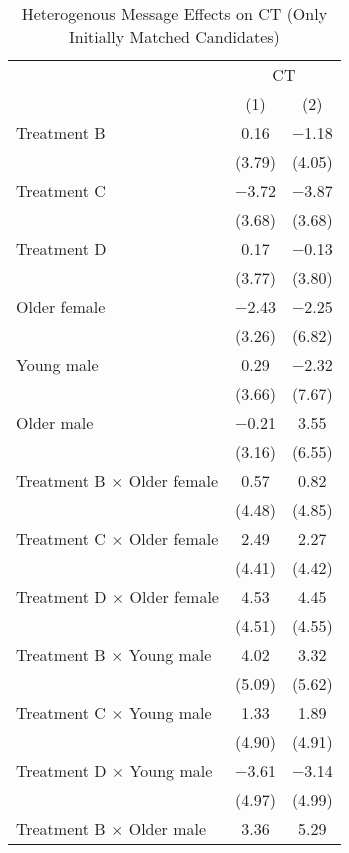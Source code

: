 \documentclass[12pt, a4paper]{article}
\begin{document}
\begin{table}[H]

\caption{\label{tab:lm-test-interaction-init-reg}Heterogenous Message Effects on CT (Only Initially Matched Candidates)}
\centering
\fontsize{8}{10}\selectfont
\begin{threeparttable}
\begin{tabular}[t]{lcc}
\toprule
\multicolumn{1}{c}{ } & \multicolumn{2}{c}{CT} \\
\cmidrule(l{3pt}r{3pt}){2-3}
  & (1) & (2)\\
\midrule
Treatment B & \num{0.16} & \num{-1.18}\\
 & (\num{3.79}) & (\num{4.05})\\
Treatment C & \num{-3.72} & \num{-3.87}\\
 & (\num{3.68}) & (\num{3.68})\\
Treatment D & \num{0.17} & \num{-0.13}\\
 & (\num{3.77}) & (\num{3.80})\\
Older female & \num{-2.43} & \num{-2.25}\\
 & (\num{3.26}) & (\num{6.82})\\
Young male & \num{0.29} & \num{-2.32}\\
 & (\num{3.66}) & (\num{7.67})\\
Older male & \num{-0.21} & \num{3.55}\\
 & (\num{3.16}) & (\num{6.55})\\
Treatment B $\times$ Older female & \num{0.57} & \num{0.82}\\
 & (\num{4.48}) & (\num{4.85})\\
Treatment C $\times$ Older female & \num{2.49} & \num{2.27}\\
 & (\num{4.41}) & (\num{4.42})\\
Treatment D $\times$ Older female & \num{4.53} & \num{4.45}\\
 & (\num{4.51}) & (\num{4.55})\\
Treatment B $\times$ Young male & \num{4.02} & \num{3.32}\\
 & (\num{5.09}) & (\num{5.62})\\
Treatment C $\times$ Young male & \num{1.33} & \num{1.89}\\
 & (\num{4.90}) & (\num{4.91})\\
Treatment D $\times$ Young male & \num{-3.61} & \num{-3.14}\\
 & (\num{4.97}) & (\num{4.99})\\
Treatment B $\times$ Older male & \num{3.36} & \num{5.29}\\

\end{tabular}
\end{threeparttable}
\end{table}
\end{document}
